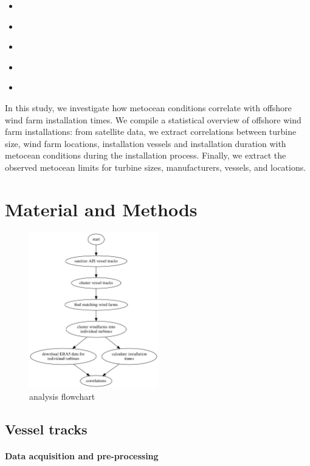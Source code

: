 \documentclass[wes, manuscript]{copernicus}
\begin{document}
\begin{itemize}
	\item \citet{li_assessment_2021}
	\item \citet{li_assessment_2021}
	\item \citet{tjaberings_evaluating_2022}
	\item \citet{wu_assessment_2022}
	\item \citet{yang_weather_2022}
\end{itemize}

In this study, we investigate how metocean conditions correlate with offshore wind farm 
installation times. We compile a statistical overview of offshore wind farm installations: 
from satellite data, we extract correlations between turbine size, wind farm locations, 
installation vessels and installation duration with metocean conditions during the installation process. 
Finally, we extract the observed metocean limits for turbine sizes, manufacturers, vessels, and locations. 

\section{Material and Methods}

\begin{figure}[ht]
	   \centering
	\includegraphics[width=0.5\textwidth]{figures/analysis_flowchart.png}
	\caption{analysis flowchart}
	\label{fig:flowchart}
\end{figure}

\subsection{Vessel tracks}

\paragraph{Data acquisition and pre-processing}
\end{document}
